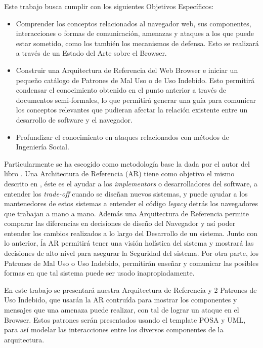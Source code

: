 Este trabajo busca cumplir con los siguientes Objetivos Específicos:

\begin{itemize}
	\item Comprender los conceptos relacionados al navegador web, sus componentes, interacciones o formas de comunicación, amenazas y ataques a los que puede estar sometido, como los también los mecanismos de defensa. Esto se realizará a través de un Estado del Arte sobre el Browser.
	\item Construir una Arquitectura de Referencia del Web Browser e iniciar un pequeño catálogo de Patrones de Mal Uso o de Uso Indebido. Esto permitirá condensar el conocimiento obtenido en el punto anterior a través de documentos semi-formales, lo que permitirá generar una guía para comunicar los conceptos relevantes que pudieran afectar la relación existente entre un desarrollo de software y el navegador.
	\item Profundizar el conocimiento en ataques relacionados con métodos de Ingeniería Social.
	
\end{itemize} 

Particularmente se ha escogido como metodología base la dada por el autor del libro \cite{fernandez2013security}. Una Architectura de Referencia (AR) tiene como objetivo el mismo descrito en \cite{2005-grosskurth-browser-refarch, preprint-grosskurth-browser-archevol}, éste es el ayudar a los \textit{implementors} o desarrolladores del software, a entender los \textit{trade-off} cuando se diseñan nuevos sistemas, y puede ayudar a los mantenedores de estos sistemas a entender el código \textit{legacy} detrás los navegadores que trabajan a mano a mano. Además una Arquitectura de Referencia permite comparar las diferencias en decisiones de diseño del Navegador y así poder entender los cambios realizados a lo largo del Desarrollo de un sistema. Junto con lo anterior, ĺa AR permitirá tener una visión holística del sistema y mostrará las decisiones de alto nivel para asegurar la Seguridad del sistema. Por otra parte, los Patrones de Mal Uso o Uso Indebido, permitirán enseñar y comunicar las posibles formas en que tal sistema puede ser usado inapropiadamente.

En este trabajo se presentará nuestra Arquitectura de Referencia y 2 Patrones de Uso Indebido, que usarán la AR contruída para mostrar los componentes y mensajes que una amenaza puede realizar, con tal de lograr un ataque en el Browser. Estos patrones serán presentados usando el template POSA \cite{buschman1996system} y UML, para así modelar las interacciones entre los diversos componentes de la arquitectura.

